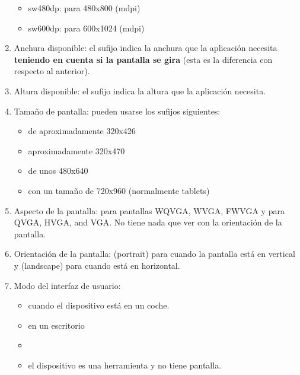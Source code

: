 \documentclass[a4paper,12pt,spanish]{sphinxmanual}
\begin{document}
\begin{enumerate}
\begin{itemize}
\item {} 
sw480dp: para 480x800 (mdpi)

\item {} 
sw600dp: para 600x1024 (mdpi)

\end{itemize}

\item {} 
Anchura disponible: el sufijo  indica la anchura que la aplicación necesita \textbf{teniendo en cuenta si la pantalla se gira} (esta es la diferencia con respecto al anterior).

\item {} 
Altura disponible: el sufijo  indica la altura que la aplicación necesita.

\item {} 
Tamaño de pantalla: pueden usarse los sufijos siguientes:
\begin{itemize}
\item {} 
 de aproximadamente 320x426

\item {} 
 aproximadamente 320x470

\item {} 
 de unos 480x640

\item {} 
 con un tamaño de 720x960 (normalmente tablets)

\end{itemize}

\item {} 
Aspecto de la pantalla:      para pantallas WQVGA, WVGA, FWVGA y  para QVGA, HVGA, and VGA. No tiene nada que ver con la orientación de la pantalla.

\item {} 
Orientación de la pantalla:  (portrait) para cuando la pantalla está en vertical y  (landscape) para cuando está en horizontal.

\item {} 
Modo del interfaz de usuario:
\begin{itemize}
\item {} 
 cuando el dispositivo está en un coche.

\item {} 
 en un escritorio

\item {} 

\item {} 
 el dispositivo es una herramienta y no tiene pantalla.


\end{itemize}
\end{enumerate}
\end{document}
